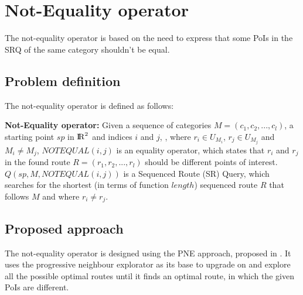 

\section{Not-Equality operator}
The not-equality operator is based on the need to express that some PoIs in the SRQ of the same category shouldn't be equal.

\subsection{Problem definition} 
\label{sec:problemNEO}
The not-equality operator is defined as follows: \newline

\textbf{Not-Equality operator:} Given a sequence of categories $M = (c_1, c_2, ..., c_l)$, a starting point $sp$ in ${\rm I\!R}^2$ and indices $i$ and $j$, , where $r_i \in U_{M_{i}}$, $r_j \in U_{M_{j}}$ and $M_i \neq M_j$, $NOTEQUAL(i, j)$ is an equality operator, which states that $r_i$ and $r_j$ in the found route $R = (r_1, r_2, ..., r_l)$ should be different points of interest.
$Q(sp, M, NOTEQUAL(i, j))$ is a Sequenced Route (SR) Query, which searches for the shortest (in terms of function $length$) sequenced route $R$ that follows $M$ and where $r_i \neq r_j$.


\subsection{Proposed approach} 
\label{sec:approachNEO}
The not-equality operator is designed using the PNE approach, proposed in \cite{OSR}. It uses the progressive neighbour explorator as its base to upgrade on and explore all the possible optimal routes until it finds an optimal route, in which the given PoIs are different.

